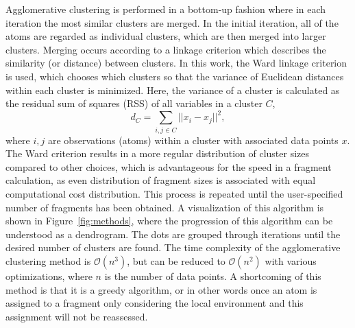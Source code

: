 Agglomerative clustering\autocite{Ward1963} is performed in a bottom-up fashion where in each iteration the most similar clusters are merged. 
In the initial iteration, all of the atoms are regarded as individual clusters, which are then merged into larger clusters. 
Merging occurs according to a linkage criterion which describes the similarity (or distance) between clusters.
In this work, the Ward linkage criterion is used, which chooses which clusters so that the variance of Euclidean distances within each cluster is minimized.
Here, the variance of a cluster is calculated as the residual sum of squares (RSS) of all variables in a cluster $C$,
\begin{equation}
d_{C} = \sum_{i,j \in C} ||x_{i} - x_{j}||^2,
\end{equation}
where $i,j$ are observations (atoms) within a cluster with associated data points $x$. 
The Ward criterion\autocite{Ward1963} results in a more regular distribution of cluster sizes compared to other choices, which is advantageous for the speed in a fragment calculation, as even distribution of fragment sizes is associated with equal computational cost distribution.
This process is repeated until the user-specified number of fragments has been obtained. 
A visualization of this algorithm is shown in Figure~\ref{fig:methods}, where the progression of this algorithm can be understood as a dendrogram.
The dots are grouped through iterations until the desired number of clusters are found.
The time complexity of the agglomerative clustering method is $\mathcal{O}(n^3)$, but can be reduced to $\mathcal{O}(n^2)$ with various optimizations, where $n$ is the number of data points.\autocite{10.1093/comjnl/16.1.30}
A shortcoming of this method is that it is a greedy algorithm, or in other words once an atom is assigned to a fragment only considering the local environment and this assignment will not be reassessed. 

